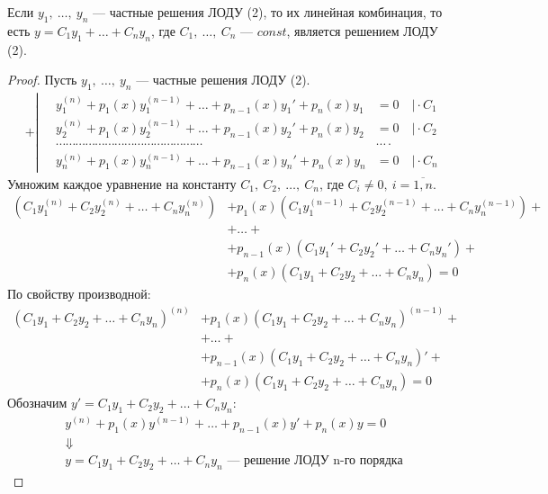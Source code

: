 \newpage
\begin{theorem}
    Если $y_1,\ \ldots,\ y_n$ --- частные решения ЛОДУ (2), то их линейная комбинация, то есть $y = C_1y_1 + \ldots + C_ny_n$, где $C_1,\ \ldots,\ C_n$ --- $const$, является решением ЛОДУ (2).
\end{theorem}
\begin{proof}
    Пусть $y_1,\ \ldots,\ y_n$ --- частные решения ЛОДУ (2).
    \begin{align*}
        + \left|\quad\begin{aligned}
            y_1^{(n)} + p_1(x)y_1^{(n-1)} + \ldots + p_{n-1}(x)y_1' + p_n(x)y_1 &= 0\quad \Big| \cdot C_1 \\ 
            y_2^{(n)} + p_1(x)y_2^{(n-1)} + \ldots + p_{n-1}(x)y_2' + p_n(x)y_2 &= 0\quad \Big| \cdot C_2 \\
            \cdots\cdots\cdots\cdots\cdots\cdots\cdots\cdots\cdots\cdots\cdots\cdots\cdots\cdots\cdots&\cdots\cdot \\
            y_n^{(n)} + p_1(x)y_n^{(n-1)} + \ldots + p_{n-1}(x)y_n' + p_n(x)y_n &= 0\quad \Big| \cdot C_n
        \end{aligned}\right.
    \end{align*}
    Умножим каждое уравнение на константу $C_1,\ C_2,\ \ldots,\ C_n$, где $C_i \ne 0,\ i = \overline{1,n}$.
    \begin{align*}
        \left(C_1y_1^{(n)} + C_2y_2^{(n)} + \ldots + C_ny_n^{(n)}\right) &+ p_1(x)\left(C_1y_1^{(n-1)} + C_2y_2^{(n-1)} + \ldots + C_ny_n^{(n-1)}\right) + \\ 
        &+ \ldots + \\ 
        &+ p_{n-1}(x) \left(C_1y_1' + C_2y_2' + \ldots + C_ny_n'\right) + \\ 
        &+ p_{n}(x) \left(C_1y_1 + C_2y_2 + \ldots + C_ny_n\right) = 0
    \end{align*}
    По свойству производной:
    \begin{align*}
        \left(C_1y_1 + C_2y_2 + \ldots + C_ny_n\right)^{(n)} &+ p_1(x)\left(C_1y_1 + C_2y_2 + \ldots + C_ny_n\right)^{(n-1)} + \\ 
        &+ \ldots + \\ 
        &+ p_{n-1}(x) \left(C_1y_1 + C_2y_2 + \ldots + C_ny_n\right)' + \\ 
        &+ p_{n}(x) \left(C_1y_1 + C_2y_2 + \ldots + C_ny_n\right) = 0
    \end{align*}
    Обозначим $y' = C_1y_1 + C_2y_2 + \ldots + C_ny_n$:
    \begin{gather*}
        y^{(n)} + p_1(x) y^{(n-1)} + \ldots + p_{n-1} (x)y' + p_n(x) y = 0 \\
        \Downarrow \\
        y = C_1y_1 + C_2y_2 + \ldots + C_ny_n \text{ --- решение ЛОДУ n-го порядка}
    \end{gather*}
\end{proof}

